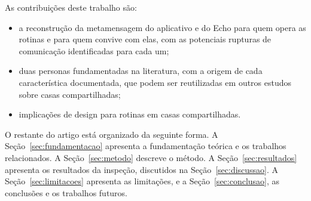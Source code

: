 As contribuições deste trabalho são:

\begin{itemize}
  \item a reconstrução da metamensagem do aplicativo e do Echo para quem
        opera as rotinas e para quem convive com elas, com as potenciais
        rupturas de comunicação identificadas para cada um;
  \item duas personas fundamentadas na literatura, com a origem de cada
        característica documentada, que podem ser reutilizadas em outros
        estudos sobre casas compartilhadas;
  \item implicações de design para rotinas em casas compartilhadas.
\end{itemize}

O restante do artigo está organizado da seguinte forma. A
Seção~\ref{sec:fundamentacao} apresenta a fundamentação teórica e os
trabalhos relacionados. A Seção~\ref{sec:metodo} descreve o método. A
Seção~\ref{sec:resultados} apresenta os resultados da inspeção,
discutidos na Seção~\ref{sec:discussao}. A Seção~\ref{sec:limitacoes}
apresenta as limitações, e a Seção~\ref{sec:conclusao}, as conclusões e
os trabalhos futuros.
